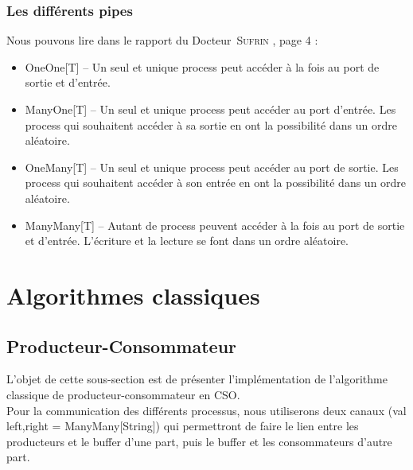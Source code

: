 \documentclass[a4paper,11pt,french]{report}
\begin{document}
\subsubsection{Les différents pipes}
Nous pouvons lire dans le rapport du Docteur~\textsc{Sufrin} \cite{cpa2008-cso}, page 4 :
\begin{itemize}
\renewcommand{\labelitemi}{$\diamond$}
\item \textsf{OneOne[T]} -- Un seul et unique process peut accéder à la fois au port de sortie et d'entrée.
\item \textsf{ManyOne[T]} -- Un seul et unique process peut accéder au port d'entrée. Les process qui souhaitent accéder à sa sortie en ont la possibilité dans un ordre aléatoire.
\item \textsf{OneMany[T]} -- Un seul et unique process peut accéder au port de sortie. Les process qui souhaitent accéder à son entrée en ont la possibilité dans un ordre aléatoire.
\item \textsf{ManyMany[T]} -- Autant de process peuvent accéder à la fois au port de sortie et d'entrée. L'écriture et la lecture se font dans un ordre aléatoire.
\end{itemize}

\section{Algorithmes classiques}
\subsection{Producteur-Consommateur}

L'objet de cette sous-section est de présenter l'implémentation de l'algorithme classique de producteur-consommateur en CSO.\\
Pour la communication des différents processus, nous utiliserons deux canaux (\textsf{val left,right = ManyMany[String]}) qui permettront de faire le lien entre les producteurs et le buffer d'une part, puis le buffer et les consommateurs d'autre part.
\end{document}
